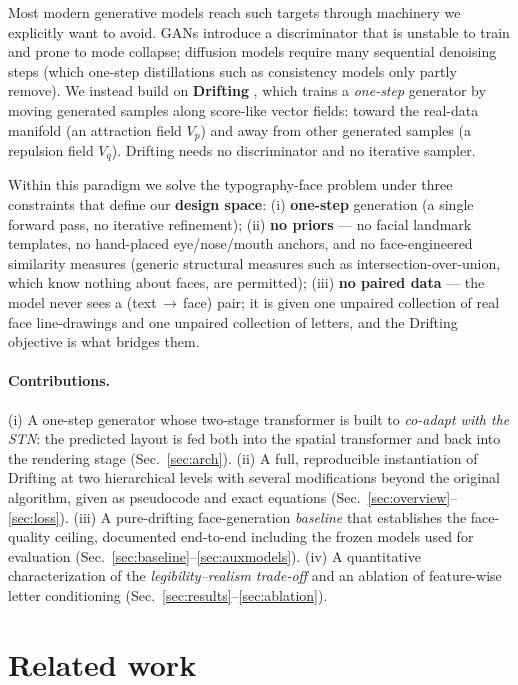 \documentclass{article}
\begin{document}
Most modern generative models reach such targets through machinery we explicitly want to avoid. GANs
\citep{goodfellow2014gan} introduce a discriminator that is unstable to train and prone to mode
collapse; diffusion models \citep{ho2020ddpm} require many sequential denoising steps (which one-step
distillations such as consistency models \citep{song2023consistency} only partly remove). We instead
build on \textbf{Drifting} \citep{lambert2026drifting}, which trains a \emph{one-step} generator by
moving generated samples along score-like vector fields: toward the real-data manifold (an attraction
field $V_p$) and away from other generated samples (a repulsion field $V_q$). Drifting needs no
discriminator and no iterative sampler.

Within this paradigm we solve the typography-face problem under three constraints that define our
\textbf{design space}: (i) \textbf{one-step} generation (a single forward pass, no iterative
refinement); (ii) \textbf{no priors} --- no facial landmark templates, no hand-placed eye/nose/mouth
anchors, and no face-engineered similarity measures (generic structural measures such as
intersection-over-union, which know nothing about faces, are permitted); (iii) \textbf{no paired
data} --- the model never sees a (text\,$\to$\,face) pair; it is given one unpaired collection of real
face line-drawings and one unpaired collection of letters, and the Drifting objective is what bridges
them.

\paragraph{Contributions.}
(i) A one-step generator whose two-stage transformer is built to \emph{co-adapt with the STN}: the
predicted layout is fed both into the spatial transformer and back into the rendering stage
(Sec.~\ref{sec:arch}). (ii) A full, reproducible instantiation of Drifting at two hierarchical levels
with several modifications beyond the original algorithm, given as pseudocode and exact equations
(Sec.~\ref{sec:overview}--\ref{sec:loss}). (iii) A pure-drifting face-generation \emph{baseline} that
establishes the face-quality ceiling, documented end-to-end including the frozen models used for
evaluation (Sec.~\ref{sec:baseline}--\ref{sec:auxmodels}). (iv) A quantitative characterization of the
\emph{legibility--realism trade-off} and an ablation of feature-wise letter conditioning
(Sec.~\ref{sec:results}--\ref{sec:ablation}).

\section{Related work}
\label{sec:related}
\end{document}
